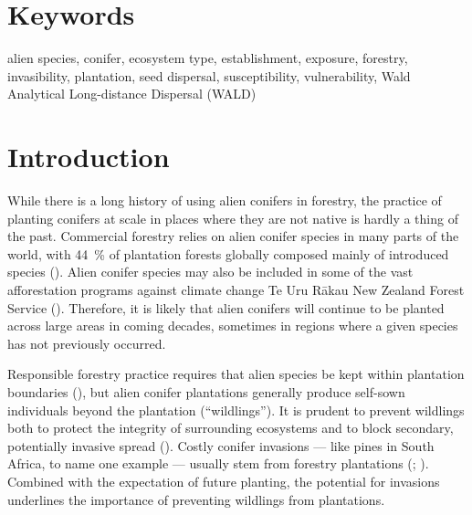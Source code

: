 \documentclass[
]{article}
\begin{document}
\section{Keywords}\label{keywords}

alien species, conifer, ecosystem type, establishment, exposure, forestry,
invasibility, plantation, seed dispersal, susceptibility, vulnerability, Wald
Analytical Long-distance Dispersal (WALD)

\newpage

\section{Introduction}\label{introduction}

While there is a long history of using alien conifers in forestry, the practice
of planting conifers at scale in places where they are not native is hardly a
thing of the past. Commercial forestry relies on alien conifer species in many
parts of the world, with 44~\% of plantation forests globally composed mainly of
introduced species (). Alien conifer species may
also be included in some of the vast afforestation programs against climate
change Te Uru Rākau New Zealand Forest Service (). Therefore, it is likely
that alien conifers will continue to be planted across large areas in coming
decades, sometimes in regions where a given species has not previously occurred.

Responsible forestry practice requires that alien species be kept within
plantation boundaries (), but alien
conifer plantations generally produce self-sown individuals beyond the
plantation (``wildlings''). It is prudent to prevent wildlings both to protect the
integrity of surrounding ecosystems and to block secondary, potentially invasive
spread (). Costly conifer invasions --- like
pines in South Africa, to name one example --- usually stem from forestry
plantations (; ). Combined with the expectation of
future planting, the potential for invasions underlines the importance of
preventing wildlings from plantations.
\end{document}

